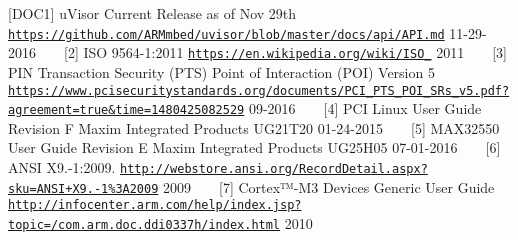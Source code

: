 \label{_r_e_f_e_r_e_n_c_e_s_DOC1}%
%
\mbox{[}D\+O\+C1\mbox{]} u\+Visor Current Release as of Nov 29th \href{https://github.com/ARMmbed/uvisor/blob/master/docs/api/API.md}{\tt https\+://github.\+com/\+A\+R\+Mmbed/uvisor/blob/master/docs/api/\+A\+P\+I.\+md} 11-\/29-\/2016 ~\newline
~\newline
\label{_r_e_f_e_r_e_n_c_e_s_DOC2}%
%
\mbox{[}2\mbox{]} I\+SO 9564-\/1\+:2011 \href{https://en.wikipedia.org/wiki/ISO_9564}{\tt https\+://en.\+wikipedia.\+org/wiki/\+I\+S\+O\+\_} 2011 ~\newline
~\newline
\label{_r_e_f_e_r_e_n_c_e_s_DOC3}%
%
\mbox{[}3\mbox{]} P\+IN Transaction Security (P\+TS) Point of Interaction (P\+OI) Version 5 \href{https://www.pcisecuritystandards.org/documents/PCI_PTS_POI_SRs_v5.pdf?agreement=true&time=1480425082529}{\tt https\+://www.\+pcisecuritystandards.\+org/documents/\+P\+C\+I\+\_\+\+P\+T\+S\+\_\+\+P\+O\+I\+\_\+\+S\+Rs\+\_\+v5.\+pdf?agreement=true\&time=1480425082529} 09-\/2016 ~\newline
~\newline
\label{_r_e_f_e_r_e_n_c_e_s_DOC4}%
%
\mbox{[}4\mbox{]} P\+CI Linux User Guide Revision F Maxim Integrated Products U\+G21\+T20 01-\/24-\/2015 ~\newline
~\newline
\label{_r_e_f_e_r_e_n_c_e_s_DOC5}%
%
\mbox{[}5\mbox{]} M\+A\+X32550 User Guide Revision E Maxim Integrated Products U\+G25\+H05 07-\/01-\/2016 ~\newline
~\newline
\label{_r_e_f_e_r_e_n_c_e_s_DOC6}%
%
\mbox{[}6\mbox{]} A\+N\+SI X9.-\/1\+:2009. \href{http://webstore.ansi.org/RecordDetail.aspx?sku=ANSI+X9.24-1%3A2009}{\tt http\+://webstore.\+ansi.\+org/\+Record\+Detail.\+aspx?sku=\+A\+N\+S\+I+\+X9.\+24-\/1\%3\+A2009} 2009 ~\newline
~\newline
\label{_r_e_f_e_r_e_n_c_e_s_DOC7}%
%
\mbox{[}7\mbox{]} Cortex™-\/\+M3 Devices Generic User Guide \href{http://infocenter.arm.com/help/index.jsp?topic=/com.arm.doc.ddi0337h/index.html}{\tt http\+://infocenter.\+arm.\+com/help/index.\+jsp?topic=/com.\+arm.\+doc.\+ddi0337h/index.\+html} 2010 ~\newline
